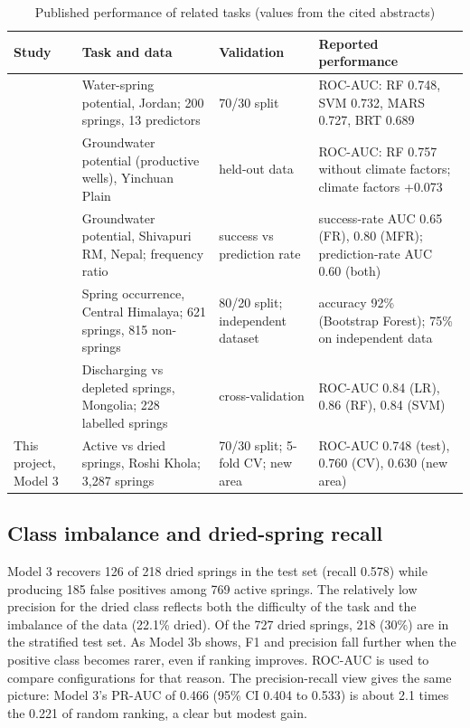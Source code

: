\documentclass[12pt,a4paper]{article}
\begin{document}
\begin{table}[htbp]
\centering
\footnotesize
\caption{Published performance of related tasks (values from the cited abstracts)}
\label{tab:literature}
\begin{tabularx}{\linewidth}{LLLL}
\toprule
\textbf{Study} & \textbf{Task and data} & \textbf{Validation} & \textbf{Reported performance} \\
\midrule
\citet{alshabeeb2023} & Water-spring potential, Jordan; 200 springs, 13 predictors & 70/30 split & ROC-AUC: RF 0.748, SVM 0.732, MARS 0.727, BRT 0.689 \\
\citet{guo2023} & Groundwater potential (productive wells), Yinchuan Plain & held-out data & ROC-AUC: RF 0.757 without climate factors; climate factors +0.073 \\
\citet{upadhyaya2024} & Groundwater potential, Shivapuri RM, Nepal; frequency ratio & success vs prediction rate & success-rate AUC 0.65 (FR), 0.80 (MFR); prediction-rate AUC 0.60 (both) \\
\citet{niraula2021} & Spring occurrence, Central Himalaya; 621 springs, 815 non-springs & 80/20 split; independent dataset & accuracy 92\% (Bootstrap Forest); 75\% on independent data \\
\citet{ishikawa2025} & Discharging vs depleted springs, Mongolia; 228 labelled springs & cross-validation & ROC-AUC 0.84 (LR), 0.86 (RF), 0.84 (SVM) \\
This project, Model 3 & Active vs dried springs, Roshi Khola; 3,287 springs & 70/30 split; 5-fold CV; new area & ROC-AUC 0.748 (test), 0.760 (CV), 0.630 (new area) \\
\bottomrule
\end{tabularx}
\end{table}

\subsection{Class imbalance and dried-spring recall}

Model 3 recovers 126 of 218 dried springs in the test set (recall 0.578) while producing 185 false positives among 769 active springs. The relatively low precision for the dried class reflects both the difficulty of the task and the imbalance of the data (22.1\% dried). Of the 727 dried springs, 218 (30\%) are in the stratified test set. As Model 3b shows, F1 and precision fall further when the positive class becomes rarer, even if ranking improves. ROC-AUC is used to compare configurations for that reason. The precision-recall view \citep{saito2015} gives the same picture: Model 3's PR-AUC of 0.466 (95\% CI 0.404 to 0.533) is about 2.1 times the 0.221 of random ranking, a clear but modest gain.
\end{document}
